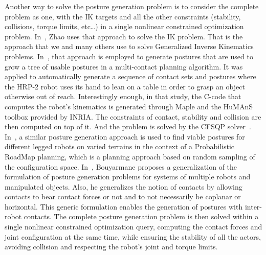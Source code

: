 Another way to solve the posture generation problem is to consider the complete problem as one, with the IK targets and all the other constraints (stability, collisions, torque limits, etc\ldots) in a single nonlinear constrained optimization problem.
In~\cite{Zhao1994}, Zhao uses that approach to solve the IK problem.
That is the approach that we and many others use to solve Generalized Inverse Kinematics problems.
In~\cite{escande:iros:2006}, that approach is employed to generate postures that are used to grow a tree of usable postures in a multi-contact planning algorithm.
It was applied to automatically generate a sequence of contact sets and postures where the HRP-2 robot uses its hand to lean on a table in order to grasp an object otherwise out of reach.
Interestingly enough, in that study, the C-code that computes the robot's kinematics is generated through Maple and the HuMAnS toolbox provided by INRIA.
The constraints of contact, stability and collision are then computed on top of it.
And the problem is solved by the CFSQP solver~\cite{cfsqp:manual}.
In~\cite{hauser:ijrr:2008}, a similar posture generation approach is used to find viable postures for different legged robots on varied terrains in the context of a Probabilistic RoadMap planning, which is a planning approach based on random sampling of the configuration space.
In~\cite{bouyarmane2010static}, Bouyarmane proposes a generalization of the formulation of posture generation problems for systems of multiple robots and manipulated objects.
Also, he generalizes the notion of contacts by allowing contacts to bear contact forces or not and to not necessarily be coplanar or horizontal.
This generic formulation enables the generation of postures with inter-robot contacts.
The complete posture generation problem is then solved within a single nonlinear constrained optimization query, computing the contact forces and joint configuration at the same time, while ensuring the stability of all the actors, avoiding collision and respecting the robot's joint and torque limits.

